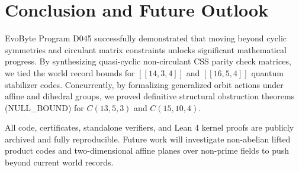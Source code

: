 \documentclass[11pt,a4paper]{article}
\begin{document}
\section{Conclusion and Future Outlook}
\label{sec:conclusion}
EvoByte Program D045 successfully demonstrated that moving beyond cyclic symmetries and circulant matrix constraints unlocks significant mathematical progress. By synthesizing quasi-cyclic non-circulant CSS parity check matrices, we tied the world record bounds for $[[14, 3, 4]]$ and $[[16, 5, 4]]$ quantum stabilizer codes. Concurrently, by formalizing generalized orbit actions under affine and dihedral groups, we proved definitive structural obstruction theorems (NULL\_BOUND) for $C(13, 5, 3)$ and $C(15, 10, 4)$.

All code, certificates, standalone verifiers, and Lean 4 kernel proofs are publicly archived and fully reproducible. Future work will investigate non-abelian lifted product codes and two-dimensional affine planes over non-prime fields to push beyond current world records.



\end{document}
